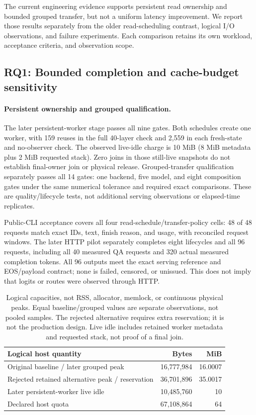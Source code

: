 The current engineering evidence supports persistent read ownership and
bounded grouped transfer, but not a uniform latency improvement. We report
those results separately from the older read-scheduling contrast, logical
I/O observations, and failure experiments. Each comparison retains its own
workload, acceptance criteria, and observation scope.

\subsection{RQ1: Bounded completion and cache-budget sensitivity}
\label{sec:rq1}
\label{sec:current-quality}
\paragraph{Persistent ownership and grouped qualification.}
The later persistent-worker stage passes all nine gates. Both schedules
create one worker, with 159 reuses in the full 40-layer check and 2,559 in
each fresh-state and no-observer check. The observed live-idle charge is
10 MiB (8 MiB metadata plus 2 MiB requested stack). Zero joins in those
still-live snapshots do not establish final-owner join or physical release.
Grouped-transfer qualification separately passes all 14 gates: one backend,
five model, and eight composition gates under the same numerical tolerance
and required exact comparisons. These are quality/lifecycle tests, not
additional serving observations or elapsed-time replicates.

Public-CLI acceptance covers all four read-schedule/transfer-policy cells:
48 of 48 requests match exact IDs, text, finish reason, and usage, with
reconciled request windows. The later HTTP pilot separately completes eight
lifecycles and all 96 requests, including all 40 measured QA requests and
320 actual measured completion tokens. All 96 outputs meet the exact serving
reference and EOS/payload contract; none is failed, censored, or unissued.
This does not imply that logits or routes were observed through HTTP.

\begin{table}[!htbp]
\centering
\small
\begin{tabularx}{\linewidth}{@{}>{\raggedright\arraybackslash}Xrr@{}}
\toprule
Logical host quantity & Bytes & MiB \\
\midrule
Original baseline / later grouped peak & 16,777,984 & 16.0007 \\
Rejected retained alternative peak / reservation & 36,701,896 & 35.0017 \\
Later persistent-worker live idle & 10,485,760 & 10 \\
Declared host quota & 67,108,864 & 64 \\
\bottomrule
\end{tabularx}
\caption{Logical capacities, not RSS, allocator, memlock, or continuous physical
peaks. Equal baseline/grouped values are separate observations, not pooled
samples. The rejected alternative requires extra reservation; it is not the
production design. Live idle includes retained worker metadata and requested
stack, not proof of a final join.}
\label{tab:current-host-capacity}
\end{table}

